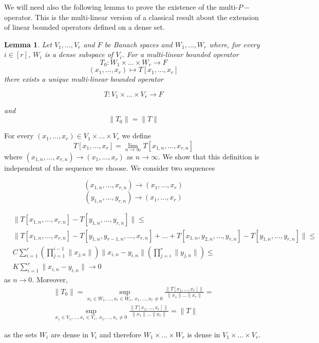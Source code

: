 \documentclass[11pt]{article}
\newtheorem{lemma}[theorem]{Lemma}
\begin{document}
We will need also the following lemma to prove the existence of the multi-$P-$operator. This is the multi-linear version of a classical result about the extension of linear bounded operators defined on a dense set.

\begin{lemma}\label{LemmMultBoundExt}
Let $V_1,\ldots,V_r$ and $F$ be Banach spaces and $W_1,\ldots, W_r$ where, for every $i\in [r]$, $W_i$ is a dense subspace of $V_i$.
For a multi-linear bounded operator
$$
  T_0:W_1\times \ldots \times W_r \longrightarrow F     
$$
$$
(x_1,\ldots,x_r)\mapsto T[x_1,\ldots,x_r]
$$
there exists a unique multi-linear bounded operator 

$$
  T:V_1\times \ldots \times V_r \longrightarrow F     
$$

and 
$$
\|T_0\|=\|T\|
$$
\end{lemma}
\proof
For every $(x_1,\ldots,x_r)\in V_1\times \ldots \times V_r$ we define
$$T[x_1,\ldots,x_r ]=\lim_{n\rightarrow \infty}T[x_{1,n},\ldots,x_{r,n}]$$
where $(x_{1,n},\ldots,x_{r,n})\rightarrow (x_1,\ldots,x_r)$ as $n\rightarrow \infty$. We show that this definition is independent of the sequence we choose. We consider two sequences

$$
(x_{1,n},\ldots,x_{r,n})\rightarrow (x_1,\ldots,x_r)
$$
$$
(y_{1,n},\ldots,y_{r,n})\rightarrow (x_1,\ldots,x_r)
$$

$$
\begin{aligned}
&\|T[x_{1,n},\ldots,x_{r,n}]-T[y_{1,n},\ldots,y_{r,n}]\|\leq\\
& \|T[x_{1,n},\ldots,x_{r,n}]-T[y_{1,n},y_{r-1,n},\ldots,x_{r,n}]+\ldots + T[x_{1,n},y_{2,n},\ldots,y_{r,n}]-T[y_{1,n},\ldots,y_{r,n}]\|\leq\\
&
C \sum^r_{i=1}\left(\prod^{i-1}_{j=1}\|x_{j,n}\|\right)\|x_{i,n}-y_{i,n}\|\left(\prod^{r}_{j=i}\|y_{j,n}\|\right)\leq \\
&
K\sum^r_{i=1}\|x_{i,n}-y_{i,n}\|\rightarrow 0
\end{aligned}
$$
as $n\rightarrow 0$. Moreover,
$$
\begin{aligned}
&\|T_0\|=\sup_{x_1\in W_1,\ldots, x_r\in W_r, \
x_1,\ldots,x_r\neq 0}\frac{\|T[x_1,\ldots,x_r]\|}{\|x_1\|\ldots\|x_r\|}=\\
&\sup_{x_1\in V_1,\ldots, x_r\in V_r, \
x_1,\ldots,x_r\neq 0}\frac{\|T[x_1,\ldots,x_r]\|}{\|x_1\|\ldots\|x_r\|}=\|T\|&
\end{aligned}
$$

as the sets $W_i$ are dense in $V_i$ and therefore $W_1\times \ldots \times W_r$ is dense in $V_1\times \ldots \times V_r$.
\end{document}
